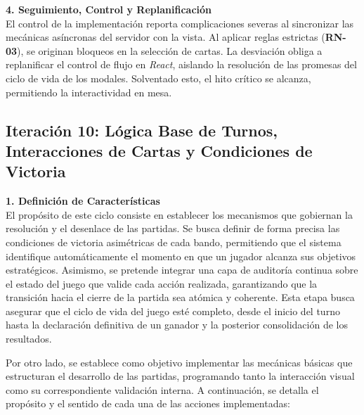 \textbf{4. Seguimiento, Control y Replanificación} \\
El control de la implementación reporta complicaciones severas al sincronizar las mecánicas asíncronas del servidor con la vista. Al aplicar reglas estrictas (\textbf{RN-03}), se originan bloqueos en la selección de cartas. La desviación obliga a replanificar el control de flujo en \textit{React}, aislando la resolución de las promesas del ciclo de vida de los modales. Solventado esto, el hito crítico se alcanza, permitiendo la interactividad en mesa.

\subsection{Iteración 10: Lógica Base de Turnos, Interacciones de Cartas y Condiciones de Victoria}

\textbf{1. Definición de Características} \\
El propósito de este ciclo consiste en establecer los mecanismos que gobiernan la resolución y el desenlace de las partidas. Se busca definir de forma precisa las condiciones de victoria asimétricas de cada bando, permitiendo que el sistema identifique automáticamente el momento en que un jugador alcanza sus objetivos estratégicos. Asimismo, se pretende integrar una capa de auditoría continua sobre el estado del juego que valide cada acción realizada, garantizando que la transición hacia el cierre de la partida sea atómica y coherente. Esta etapa busca asegurar que el ciclo de vida del juego esté completo, desde el inicio del turno hasta la declaración definitiva de un ganador y la posterior consolidación de los resultados.

Por otro lado, se establece como objetivo implementar las mecánicas básicas que estructuran el desarrollo de las partidas, programando tanto la interacción visual como su correspondiente validación interna. A continuación, se detalla el propósito y el sentido de cada una de las acciones implementadas:

